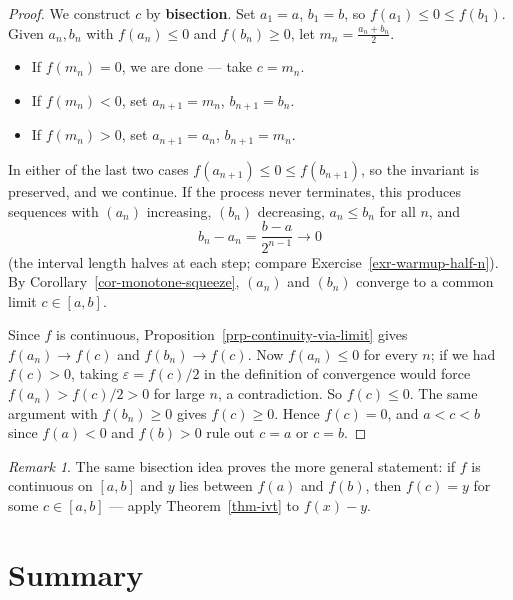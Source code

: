 \documentclass[
  letterpaper,
  DIV=11,
  numbers=noendperiod]{scrreprt}
\providecommand{\tightlist}{%
  \setlength{\itemsep}{0pt}\setlength{\parskip}{0pt}}
\theoremstyle{plain}
\theoremstyle{plain}
\theoremstyle{definition}
\theoremstyle{definition}
\theoremstyle{definition}
\theoremstyle{plain}
\theoremstyle{plain}
\theoremstyle{remark}
\newtheorem{refremark}{Remark}[chapter]
\begin{document}
\begin{proof}
We construct \(c\) by \textbf{bisection}. Set \(a_1=a\), \(b_1=b\), so
\(f(a_1)\le0\le f(b_1)\). Given \(a_n,b_n\) with \(f(a_n)\le0\) and
\(f(b_n)\ge0\), let \(m_n = \tfrac{a_n+b_n}{2}\).

\begin{itemize}
\tightlist
\item
  If \(f(m_n)=0\), we are done --- take \(c=m_n\).
\item
  If \(f(m_n)<0\), set \(a_{n+1}=m_n\), \(b_{n+1}=b_n\).
\item
  If \(f(m_n)>0\), set \(a_{n+1}=a_n\), \(b_{n+1}=m_n\).
\end{itemize}

In either of the last two cases \(f(a_{n+1})\le0\le f(b_{n+1})\), so the
invariant is preserved, and we continue. If the process never
terminates, this produces sequences with \((a_n)\) increasing, \((b_n)\)
decreasing, \(a_n\le b_n\) for all \(n\), and \[
b_n - a_n = \frac{b-a}{2^{n-1}} \longrightarrow 0
\] (the interval length halves at each step; compare
Exercise~\ref{exr-warmup-half-n}). By
Corollary~\ref{cor-monotone-squeeze}, \((a_n)\) and \((b_n)\) converge
to a common limit \(c\in[a,b]\).

Since \(f\) is continuous, Proposition~\ref{prp-continuity-via-limit}
gives \(f(a_n)\to f(c)\) and \(f(b_n)\to f(c)\). Now \(f(a_n)\le0\) for
every \(n\); if we had \(f(c)>0\), taking \(\varepsilon=f(c)/2\) in the
definition of convergence would force \(f(a_n)>f(c)/2>0\) for large
\(n\), a contradiction. So \(f(c)\le0\). The same argument with
\(f(b_n)\ge0\) gives \(f(c)\ge0\). Hence \(f(c)=0\), and \(a<c<b\) since
\(f(a)<0\) and \(f(b)>0\) rule out \(c=a\) or \(c=b\).
\end{proof}

\begin{refremark}
The same bisection idea proves the more general statement: if \(f\) is
continuous on \([a,b]\) and \(y\) lies between \(f(a)\) and \(f(b)\),
then \(f(c)=y\) for some \(c\in[a,b]\) --- apply Theorem~\ref{thm-ivt}
to \(f(x)-y\).

\label{rem-ivt-general}

\end{refremark}

\section{Summary}\label{summary-6}
\end{document}

